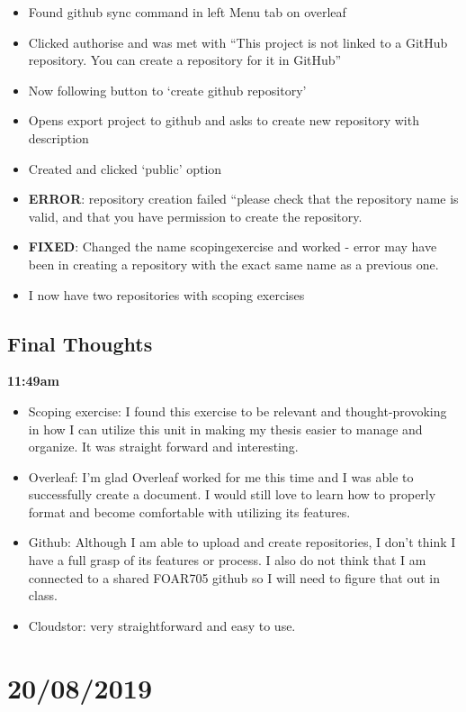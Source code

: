 \documentclass{article}
\begin{document}
\begin{itemize}
\item Found github sync command in left Menu tab on overleaf
\item Clicked authorise and was met with “This project is not linked to a GitHub repository. You can create a repository for it in GitHub”
\item Now following button to ‘create github repository’
\item Opens export project to github and asks to create new repository with description
\item Created and clicked ‘public’ option
\item \textbf{ERROR}: repository creation failed “please check that the repository name is valid,  and that you have permission to create the repository.
\item \textbf{FIXED}: Changed the name scopingexercise and worked - error may have been in creating a repository with the exact same name as a previous one.
\item I now have two repositories with scoping exercises
\end{itemize}

\subsection{Final Thoughts}

\textbf{11:49am}

\begin{itemize}
\item Scoping exercise: I found this exercise to be relevant and thought-provoking in how I can utilize this unit in making my thesis easier to manage and organize. It was straight forward and interesting. 
\item Overleaf: I’m glad Overleaf worked for me this time and I was able to successfully create a document. I would still love to learn how to properly format and become comfortable with utilizing its features. 
\item Github: Although I am able to upload and create repositories, I don’t think I have a full grasp of its features or process. I also do not think that I am connected to a shared FOAR705 github so I will need to figure that out in class.
\item Cloudstor: very straightforward and easy to use.
\end{itemize}

\section{20/08/2019}
\end{document}
